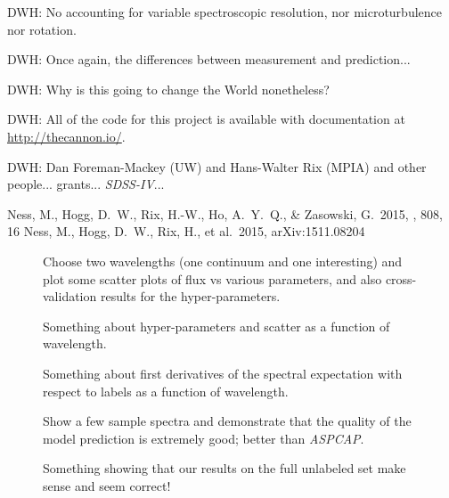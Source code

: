 \documentclass[12pt,preprint]{aastex}
\newcommand{\project}[1]{\textsl{#1}}
\newcommand{\acronym}[1]{{\small{#1}}}
\newcommand{\sdss}{\project{\acronym{SDSS-IV}}}
\newcommand{\aspcap}{\project{\acronym{ASPCAP}}}
\begin{document}
DWH: No accounting for variable spectroscopic resolution, nor
microturbulence nor rotation.

DWH:  Once again, the differences between measurement and prediction...

DWH:  Why is this going to change the World nonetheless?

DWH: All of the code for this project is available with documentation
at \url{http://thecannon.io/}.

\acknowledgements
DWH: Dan Foreman-Mackey (UW) and Hans-Walter Rix (MPIA) and other people...
grants...
\sdss...

\begin{thebibliography}{dummy}\raggedright
{} Ness, M., Hogg, D.~W., 
Rix, H.-W., Ho, A.~Y.~Q., \& Zasowski, G.\ 2015, \apj, 808, 16
 Ness, M., Hogg, D.~W., 
Rix, H., et al.\ 2015, arXiv:1511.08204 
\end{thebibliography}

\clearpage

\begin{figure}[p]
\caption{Choose two wavelengths (one continuum and one interesting)
  and plot some scatter plots of flux vs various parameters, and also
  cross-validation results for the
  hyper-parameters.\label{fig:onewavelength}}
\end{figure}

\begin{figure}[p]
\caption{Something about hyper-parameters and scatter as a function of
  wavelength.\label{fig:hyperpars}}
\end{figure}

\begin{figure}[p]
\caption{Something about first derivatives of the spectral expectation
  with respect to labels as a function of
  wavelength.\label{fig:derivatives}}
\end{figure}

\begin{figure}[p]
\caption{Show a few sample spectra and demonstrate that the quality of
  the model prediction is extremely good; better than
  \aspcap.\label{fig:correctness}}
\end{figure}

\begin{figure}[p]
\caption{Something showing that our results on the full unlabeled set
  make sense and seem correct!\label{fig:fulltest}}
\end{figure}
\end{document}
